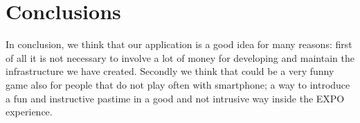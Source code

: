 
\section{Conclusions}
In conclusion, we think that our application is a good idea for many reasons: first of all it is not necessary to involve a lot of money for developing and maintain the infrastructure we have created. Secondly we think that could be a very funny game also for people that do not play often with smartphone; a way to introduce a fun and instructive pastime in a good and not intrusive way inside the EXPO experience. 
